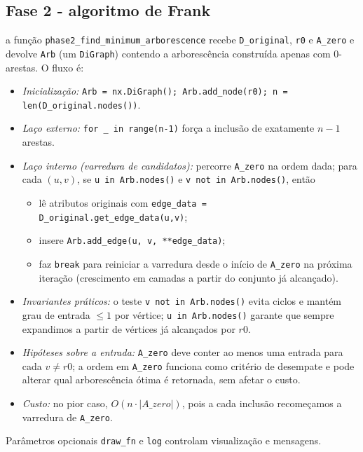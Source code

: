 \subsection{Fase 2 - algoritmo de Frank}
a função \texttt{phase2\_find\_minimum\_arborescence} recebe \texttt{D\_original}, \texttt{r0} e \texttt{A\_zero} e devolve \texttt{Arb} (um \texttt{DiGraph}) contendo a arborescência construída apenas com 0-arestas. O fluxo é:
\begin{itemize}\setlength{\itemsep}{1pt}
	\item \emph{Inicialização:} \texttt{Arb = nx.DiGraph(); Arb.add\_node(r0); n = len(D\_original.nodes())}.
	\item \emph{Laço externo:} \texttt{for \_ in range(n-1)} força a inclusão de exatamente \(n-1\) arestas.
	\item \emph{Laço interno (varredura de candidatos):} percorre \texttt{A\_zero} na ordem dada; para cada \((u,v)\), se \texttt{u in Arb.nodes()} e \texttt{v not in Arb.nodes()}, então
	      \begin{itemize}\setlength{\itemsep}{1pt}
		      \item lê atributos originais com \texttt{edge\_data = D\_original.get\_edge\_data(u,v)};
		      \item insere \texttt{Arb.add\_edge(u, v, **edge\_data)};
		      \item faz \texttt{break} para reiniciar a varredura desde o início de \texttt{A\_zero} na próxima iteração (crescimento em camadas a partir do conjunto já alcançado).
	      \end{itemize}
	\item \emph{Invariantes práticos:} o teste \texttt{v not in Arb.nodes()} evita ciclos e mantém grau de entrada \(\le 1\) por vértice; \texttt{u in Arb.nodes()} garante que sempre expandimos a partir de vértices já alcançados por \(r0\).
	\item \emph{Hipóteses sobre a entrada:} \texttt{A\_zero} deve conter ao menos uma entrada para cada \(v\neq r0\); a ordem em \texttt{A\_zero} funciona como critério de desempate e pode alterar qual arborescência ótima é retornada, sem afetar o custo.
	\item \emph{Custo:} no pior caso, \(O(n\cdot |A\_zero|)\), pois a cada inclusão recomeçamos a varredura de \texttt{A\_zero}.
\end{itemize}


Parâmetros opcionais \texttt{draw\_fn} e \texttt{log} controlam visualização e mensagens.


